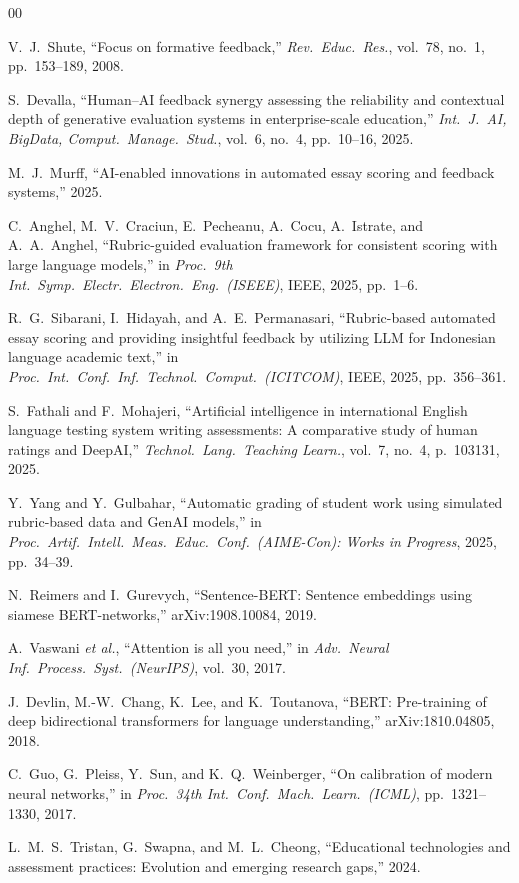 \documentclass[conference]{IEEEtran}
\begin{document}
\sloppy
\begin{thebibliography}{00}

V.~J.\ Shute, ``Focus on formative feedback,''
\textit{Rev.\ Educ.\ Res.}, vol.~78, no.~1, pp.~153--189, 2008.

S.~Devalla, ``Human--AI feedback synergy assessing the reliability and
contextual depth of generative evaluation systems in enterprise-scale
education,''
\textit{Int.\ J.\ AI, BigData, Comput.\ Manage.\ Stud.},
vol.~6, no.~4, pp.~10--16, 2025.

M.~J.\ Murff, ``AI-enabled innovations in automated essay scoring and
feedback systems,'' 2025.

C.~Anghel, M.~V.\ Craciun, E.~Pecheanu, A.~Cocu, A.~Istrate, and
A.~A.\ Anghel,\allowbreak{} ``Rubric-guided evaluation framework for consistent
scoring with large language models,'' in
\textit{Proc.\ 9th Int.\ Symp.\ Electr.\ Electron.\ Eng.\ (ISEEE)},
IEEE, 2025, pp.~1--6.

R.~G.\ Sibarani, I.~Hidayah, and A.~E.\ Permanasari,
``Rubric-based automated essay scoring and providing insightful
feedback by utilizing LLM for Indonesian language academic text,'' in
\textit{Proc.\ Int.\ Conf.\ Inf.\ Technol.\ Comput.\ (ICITCOM)},
IEEE, 2025, pp.~356--361.

S.~Fathali and F.~Mohajeri, ``Artificial intelligence in international
English language testing system writing assessments: A comparative study
of human ratings and DeepAI,''
\textit{Technol.\ Lang.\ Teaching Learn.},
vol.~7, no.~4, p.~103131, 2025.

Y.~Yang and Y.~Gulbahar, ``Automatic grading of student work using
simulated rubric-based data and GenAI models,'' in
\textit{Proc.\ Artif.\ Intell.\ Meas.\ Educ.\ Conf.\ (AIME-Con):
Works in Progress}, 2025, pp.~34--39.

N.~Reimers and I.~Gurevych, ``Sentence-BERT: Sentence embeddings using
siamese BERT-networks,'' arXiv:1908.10084, 2019.

A.~Vaswani \textit{et al.}, ``Attention is all you need,''
in \textit{Adv.\ Neural Inf.\ Process.\ Syst.\ (NeurIPS)}, vol.~30,
2017.

J.~Devlin, M.-W.\ Chang,\allowbreak{} K.~Lee, and K.~Toutanova,
``BERT: Pre-training of deep bidirectional transformers for language
understanding,'' arXiv:1810.04805, 2018.

C.~Guo, G.~Pleiss, Y.~Sun, and\allowbreak{} K.~Q.\ Weinberger,
``On calibration of modern neural networks,''
in \textit{Proc.\ 34th Int.\ Conf.\ Mach.\ Learn.\ (ICML)},
pp.~1321--1330, 2017.

L.~M.~S.\ Tristan, G.~Swapna,\allowbreak{} and M.~L.\ Cheong,
``Educational technologies and assessment practices: Evolution and
emerging research gaps,'' 2024.

\end{thebibliography}
\end{document}
